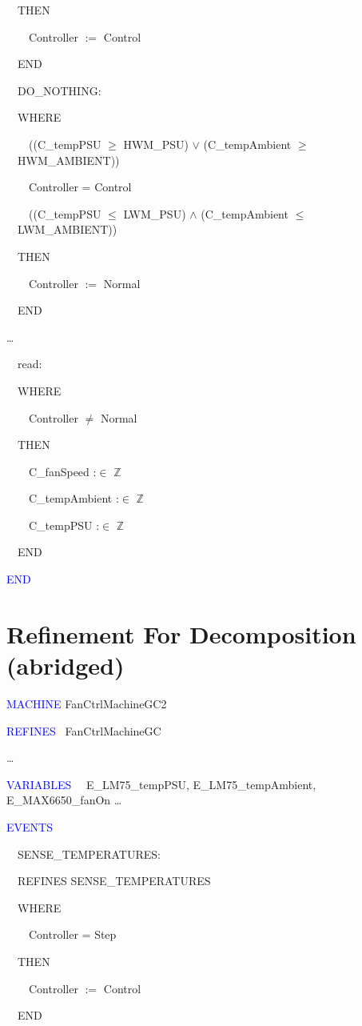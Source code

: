 \documentclass{llncs}%
\begin{document}
\ \ THEN

\ \ \ \ Controller $:=$ Control 

\ \ END

\bigskip

\ \ DO\_NOTHING:\ \  \ 

\ \ WHERE

\ \ \ \ {\textlnot}((C\_tempPSU ${\geq}$ HWM\_PSU) ${\vee}$
(C\_tempAmbient ${\geq}$ \ \ HWM\_AMBIENT)) 

\ \ \ \ Controller = Control \ \ 

\ \ \ \ {\textlnot}((C\_tempPSU ${\leq}$ LWM\_PSU) ${\wedge}$
(C\_tempAmbient ${\leq}$ \ \ LWM\_AMBIENT))

\ \ THEN

\ \ \ \ Controller $:=$ Normal 

\ \ END

\ldots

\ \ read:\ \  \ 

\ \ WHERE

\ \ \ \ Controller ${\neq}$ Normal \ \ 

\ \ THEN

\ \ \ \  C\_fanSpeed :${\in}$ $\mathbb{Z}$ 

\ \ \ \ C\_tempAmbient :${\in}$ $\mathbb{Z}$ 

\ \ \ \ C\_tempPSU :${\in}$ $\mathbb{Z}$ 

\ \ END

\textcolor{blue}{END}
%
%
%
\section{Refinement For Decomposition (abridged)}\label{refi}
\textcolor{blue}{MACHINE} FanCtrlMachineGC2 \ \ 

\textcolor{blue}{REFINES} \ FanCtrlMachineGC 

{\dots} 

\textcolor{blue}{VARIABLES} \ \ E\_LM75\_tempPSU, E\_LM75\_tempAmbient, E\_MAX6650\_fanOn
{\dots} 

\textcolor{blue}{EVENTS}

\ \ SENSE\_TEMPERATURES:\ \  \ 

\ \ REFINES SENSE\_TEMPERATURES\ \  \

\ \ WHERE

\ \ \ \ Controller = Step \ \ 

\ \ THEN

\ \ \ \ Controller $:=$ Control 

\ \ END
\end{document}
